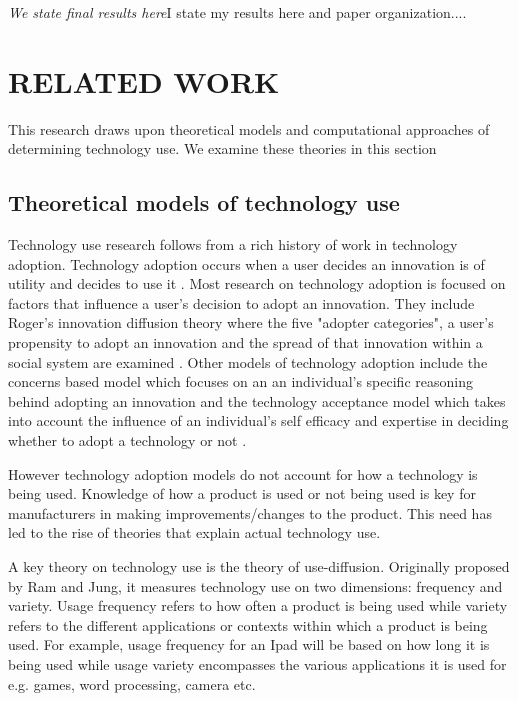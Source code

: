 \documentclass{acm_proc_article-sp}
\begin{document}
\textit{We state final results here}I state my results here and paper organization....

\section{RELATED WORK} \label{section:relatedwork}
This research draws upon theoretical models and computational approaches of determining technology use. We examine these theories in this section
\subsection{Theoretical models of technology use}
Technology use research follows from a rich history of work in technology adoption. Technology adoption occurs when a user decides an innovation is of utility and decides to use it \cite{straub2009understanding}. Most research on technology adoption is focused on factors that influence a user's decision to adopt an innovation. They include Roger's innovation diffusion theory where the five "adopter categories", a user's propensity to adopt an innovation and the spread of that innovation within a social system are examined \cite{rogers2010diffusion}. Other models of technology adoption include the concerns based model which focuses on an an individual's specific reasoning behind adopting an innovation \cite{fuller1975concerns, hall1979concerns} and the technology acceptance model \cite{legris2003people} which takes into account the influence of an individual's self efficacy and expertise in deciding whether to adopt a technology or not \cite{legris2003people}.

However technology adoption models do not account for how a technology is being used. Knowledge of how a product is used or not being used is key for manufacturers in making improvements/changes to the product. This need has led to the rise of theories that explain actual technology use.

A key theory on technology use is the theory of use-diffusion. Originally proposed by Ram and Jung\cite{ram1990conceptualization}, it measures technology use on two dimensions: frequency and variety. Usage frequency refers to how often a product is being used while variety refers to the different applications or contexts within which a product is being used. For example, usage frequency for an Ipad will be based on how long it is being used while usage variety encompasses the various applications it is used for e.g. games, word processing, camera etc.
\end{document}

